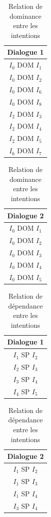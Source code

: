 		
	\begin{table}
		\parbox{.45\linewidth}{
			\centering
			\begin{tabular}{c}
				\hline
				\hline
				Dialogue 1 \\
				\hline
				\hline
				$I_0$ DOM $I_1$ \\
				$I_0$ DOM $I_2$ \\
				$I_0$ DOM $I_6$ \\
				$I_0$ DOM $I_8$ \\
				$I_2$ DOM $I_3$ \\
				$I_2$ DOM $I_4$ \\
				$I_2$ DOM $I_5$ \\
				$I_6$ DOM $I_7$ \\
				\hline
				\hline
			\end{tabular}
		}
		\hfill
		\parbox{.45\linewidth}{
			\centering
			\begin{tabular}{c}
				\hline
				\hline
				Dialogue 2 \\
				\hline
				\hline
				$I_0$ DOM $I_1$ \\
				$I_0$ DOM $I_2$ \\
				$I_0$ DOM $I_3$ \\
				$I_0$ DOM $I_4$ \\
				$I_0$ DOM $I_5$ \\
				\hline
				\hline
			\end{tabular} 
			
		}
		\caption{ \label{tab:domRelation} Relation de dominance entre les intentions}
	\end{table}

	\begin{table}
	\parbox{.45\linewidth}{
		\centering
		\begin{tabular}{c}
			\hline
			\hline
			Dialogue 1 \\
			\hline
			\hline
			$I_1$ SP $I_2$ \\
			$I_2$ SP $I_3$ \\
			$I_3$ SP $I_4$ \\
			$I_4$ SP $I_5$ \\
			\hline
			\hline
			
		\end{tabular}
	}
	\hfill
	\parbox{.45\linewidth}{
		\centering
		\begin{tabular}{c}
			\hline
			\hline
			Dialogue 2 \\
			\hline
			\hline
			$I_1$ SP $I_2$ \\
			$I_1$ SP $I_3$ \\
			$I_1$ SP $I_4$ \\
			$I_3$ SP $I_4$ \\
			\hline
			\hline
		\end{tabular} 
		
	}
	\caption{ \label{tab:dependanceRelation} Relation de dépendance entre les intentions}
\end{table}
	
